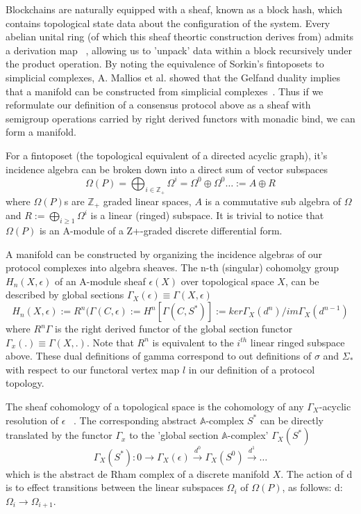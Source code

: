 \documentclass[runningheads]{llncs}
\begin{document}
Blockchains are naturally equipped with a sheaf, known as a block hash, which contains topological state data about the configuration of the system. Every abelian unital ring (of which this sheaf theortic construction derives from) admits a derivation map ~\cite{ref_article7}, allowing us to 'unpack' data within a block recursively under the product operation. By noting the equivalence of Sorkin's fintoposets to simplicial complexes, A. Mallios et al. showed that the Gelfand duality implies that a manifold can be constructed from simplicial complexes~\cite{ref_article6}. Thus if we reformulate our definition of a consensus protocol above as a sheaf with semigroup operations carried by right derived functors with monadic bind, we can form a manifold. 

For a fintoposet (the topological equivalent of a directed acyclic graph), it's incidence algebra can be broken down into a direct sum of vector subspaces
\begin{equation}
\Omega(P) = \bigoplus_{i \in \mathbb{Z}_+} \Omega^i = \Omega^0 \oplus \Omega^0 \dots := A \oplus R
\end{equation}
where $\Omega(P)$s are $\mathbb{Z}_+$ graded linear spaces, $A$ is a commutative sub algebra of $\Omega$ and $R := \bigoplus_{i \geq 1} \Omega^i$ is a linear (ringed) subspace. It is trivial to notice that $\Omega(P)$ is an A-module of a Z+-graded discrete differential form. 

A manifold can be constructed by organizing the incidence algebras of our protocol complexes into algebra sheaves. The n-th (singular) cohomolgy group $H_n(X, \epsilon)$ of an A-module sheaf $\epsilon(X)$ over topological space $X$, can be described by global sections $\Gamma_X(\epsilon) \equiv \Gamma (X, \epsilon)$
\begin{equation}
H_n(X, \epsilon) := R^n(\Gamma(C,\epsilon) := H^n[\Gamma(C, S^*)] := ker\Gamma_X(d^n)/im\Gamma_X(d^{n-1})
\end{equation}
where $R^n\Gamma$ is the right derived functor of the global section functor $\Gamma_x(.) \equiv \Gamma(X,.)$. Note that $R^n$ is equivalent to the $i^{th}$ linear ringed subspace above. These dual definitions of gamma correspond to out definitions of $\sigma$ and $\Sigma_*$ with respect to our functoral vertex map $l$ in our definition of a protocol topology.

The sheaf cohomology of a topological space is the cohomology of any $\Gamma_X$-acyclic resolution of $\epsilon$ ~\cite{ref_book1}. The corresponding abstract $\mathbb{A}$-complex $S^*$ can be directly translated by the functor $\Gamma_x$ to the 'global section $\mathbb{A}$-complex' $\Gamma_X(S^*)$
\begin{equation}
\Gamma_X(S^*):  0 \xrightarrow{~} \Gamma_X(\epsilon) \xrightarrow{d^0} \Gamma_X(S^0) \xrightarrow{d^1} \dots
\end{equation}
which is the abstract de Rham complex of a discrete manifold $X$. The action of d is to effect transitions between the linear subspaces $\Omega_i$ of $\Omega(P)$, as follows: d: $\Omega_i \rightarrow \Omega_{i+1}$.
\end{document}
